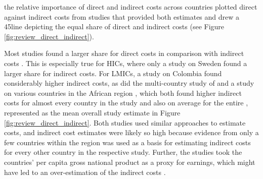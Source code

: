 \DIFdelbegin {}\DIFdelend \DIFaddbegin {}\DIFaddend the relative importance of direct and indirect costs across countries \DIFdelbegin {}\DIFdelend \DIFaddbegin {}\DIFaddend plotted direct against indirect costs from studies that provided both estimates and drew a 45\degree line depicting the equal share of direct and indirect costs (see Figure \ref{fig:review_direct_indirect}). \DIFaddbegin {}\DIFaddend 

Most studies found a larger share for direct costs in comparison with indirect costs\DIFdelbegin {}%
\DIFdelend . This is especially true for \acp{HIC}, where only a study on Sweden \parencite{Bolin2009d} found a larger share for indirect costs. For \acp{LMIC}, a study on Colombia \parencite{Gonzalez2009b} found considerably higher indirect costs, as did the multi-country study of \textcite{Barcelo2003} and a study on various countries in the African region \parencite{Kirigia2009}, which both found higher indirect costs for almost every country in the study and also on average for the entire \DIFdelbegin {}\DIFdelend \DIFaddbegin {}\DIFaddend , represented as the mean overall study estimate in Figure \ref{fig:review_direct_indirect}.  Both studies used similar approaches to estimate costs, and indirect cost estimates were likely so high because evidence from only a few countries within the region was used as a basis for estimating indirect costs for every other country in the respective study. Further, the studies took the countries' per capita gross national product as a proxy for earnings, which might have led to an over-estimation of the indirect costs \parencite{Kirigia2009}. 

